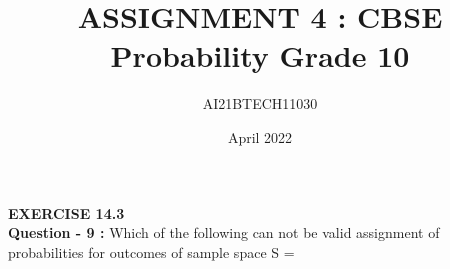 \documentclass[journal,12pt,twocolumn]{IEEEtran}
\begin{document}
\title{ASSIGNMENT 4 : CBSE Probability Grade 10} 
\author{AI21BTECH11030} 
\date{April 2022}     
\maketitle
\newpage
\bigskip
\textbf{EXERCISE 14.3}\\
\textbf{Question - 9 :}
Which of the following can not be valid assignment of probabilities for outcomes of sample space S = 

\begin{table}[ht!]
\begin{center}
    
	\vspace{5pt}
\caption{}
\label{table:table1}
\end{center}
	
\end{table}
\end{document}
